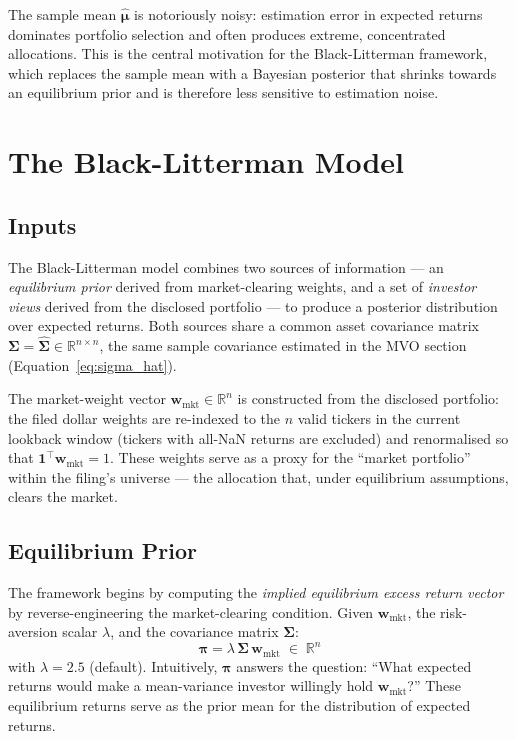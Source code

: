\documentclass[11pt, a4paper]{article}
\begin{document}
\begin{limitbox}
  The sample mean $\hat{\bm{\mu}}$ is notoriously noisy: estimation error in
  expected returns dominates portfolio selection and often produces extreme,
  concentrated allocations. This is the central motivation for the
  Black-Litterman framework, which replaces the sample mean with a
  Bayesian posterior that shrinks towards an equilibrium prior and is therefore
  less sensitive to estimation noise.
\end{limitbox}

\section{The Black-Litterman Model}

\subsection{Inputs}

The Black-Litterman model combines two sources of information --- an
\emph{equilibrium prior} derived from market-clearing weights, and a set of
\emph{investor views} derived from the disclosed portfolio --- to produce a
posterior distribution over expected returns. Both sources share a common
asset covariance matrix $\bm{\Sigma} = \hat{\bm{\Sigma}} \in \mathbb{R}^{n
\times n}$, the same sample covariance estimated in the MVO section
(Equation~\ref{eq:sigma_hat}).

The market-weight vector $\bm{w}_{\text{mkt}} \in \mathbb{R}^{n}$ is
constructed from the disclosed portfolio: the filed dollar weights are
re-indexed to the $n$ valid tickers in the current lookback window (tickers
with all-NaN returns are excluded) and renormalised so that
$\mathbf{1}^{\top}\bm{w}_{\text{mkt}} = 1$. These weights serve as a proxy
for the ``market portfolio'' within the filing's universe --- the allocation
that, under equilibrium assumptions, clears the market.

\subsection{Equilibrium Prior}

The framework begins by computing the \emph{implied equilibrium excess return
vector} by reverse-engineering the market-clearing condition. Given
$\bm{w}_{\text{mkt}}$, the risk-aversion scalar $\lambda$, and the covariance
matrix $\bm{\Sigma}$:
\begin{equation}
  \bm{\pi} = \lambda\,\bm{\Sigma}\,\bm{w}_{\text{mkt}}
  \;\in\; \mathbb{R}^{n}
  \label{eq:pi}
\end{equation}
with $\lambda = 2.5$ (default). Intuitively, $\bm{\pi}$ answers the
question: ``What expected returns would make a mean-variance investor
willingly hold $\bm{w}_{\text{mkt}}$?''  These equilibrium returns serve as
the prior mean for the distribution of expected returns.
\end{document}
